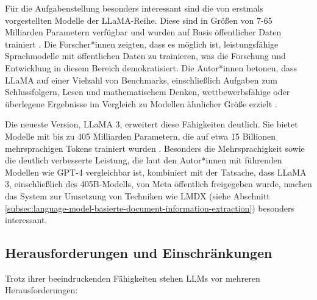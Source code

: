 Für die Aufgabenstellung besonders interessant sind die von \textcite{TouvronHugo2023LOaE} erstmals vorgestellten Modelle der LLaMA-Reihe. Diese sind in Größen von 7-65 Milliarden Parametern verfügbar und wurden auf Basis öffentlicher Daten trainiert \parencite{TouvronHugo2023LOaE}. Die Forscher*innen zeigten, dass es möglich ist, leistungsfähige Sprachmodelle mit öffentlichen Daten zu trainieren, was die Forschung und Entwicklung in diesem Bereich demokratisiert. Die Autor*innen betonen, dass LLaMA auf einer Vielzahl von Benchmarks, einschließlich Aufgaben zum Schlussfolgern, Lesen und mathematischem Denken, wettbewerbsfähige oder überlegene Ergebnisse im Vergleich zu Modellen ähnlicher Größe erzielt \parencite{TouvronHugo2023LOaE}.

Die neueste Version, LLaMA 3, erweitert diese Fähigkeiten deutlich. Sie bietet Modelle mit bis zu 405 Milliarden Parametern, die auf etwa 15 Billionen mehrsprachigen Tokens trainiert wurden \parencite{HartshornAnthony2024TL3H}. Besonders die Mehrsprachigkeit sowie die deutlich verbesserte Leistung, die laut den Autor*innen mit führenden Modellen wie GPT-4 vergleichbar ist, kombiniert mit der Tatsache, dass LLaMA 3, einschließlich des 405B-Modells, von Meta öffentlich freigegeben wurde, machen das System zur Umsetzung von Techniken wie \gls{LMDX} (siehe Abschnitt \ref{subsec:language-model-basierte-document-information-extraction}) besonders interessant.

\subsection{Herausforderungen und Einschränkungen}
\label{subsec:llm-challenges}

Trotz ihrer beeindruckenden Fähigkeiten stehen \glspl{LLM} vor mehreren Herausforderungen:

